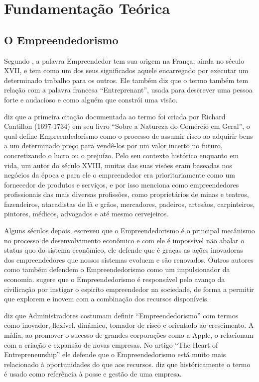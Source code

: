 \chapter[Fundamentação Teórica]{Fundamentação Teórica}
\label{cap-fundamentacao_teorica}

\section{O Empreendedorismo}
\label{section:o_empreendedorismo}

Segundo \cite{McCall2000}, a palavra Empreendedor tem sua origem na França, ainda no século XVII, e tem como um dos seus significados aquele encarregado por executar um determinado trabalho para os outros. Ele também diz que o termo também tem relação com a palavra francesa ``Entreprenant'', usada para descrever uma pessoa forte e audacioso e como alguém que constrói uma visão.

\cite{Brown2013} diz que a primeira citação documentada ao termo foi criada por Richard Cantillon (1697-1734) em seu livro ``Sobre a Natureza do Comércio em Geral'', o qual define Empreendedorismo como o processo de assumir risco ao adquirir bens a um determinado preço para vendê-los por um valor incerto no futuro, concretizando o lucro ou o prejuízo. Pelo seu contexto histórico enquanto em vida, um autor do século XVIII, muitas das suas visões eram baseadas nos negócios da época e para ele o empreendedor era prioritariamente como um fornecedor de produtos e serviços, e por isso menciona como empreendedores profissionais das mais diversas profissões, como proprietários de minas e teatros, fazendeiros, atacadistas de lã e grãos, mercadores, padeiros, artesãos, carpinteiros, pintores, médicos, advogados e até mesmo cervejeiros. 

Alguns séculos depois, \cite{Schumpeter1934} escreveu que o Empreendedorismo é o principal mecânismo no processo de desenvolvimento econômico e com ele é impossível não abalar o status quo do sistema econômico, ele defende que é graças as ações inovadoras dos empreendedores que nossos sistemas evoluem e são renovados. Outros autores como \cite{Holcombe1998, Acs2006} também defendem o Empreendedorismo como um impulsionador da economia. \cite{McClelland1961} sugere que o Empreendedorismo é responsável pelo avanço da civilicação por instigar o espiríto empreendedor na sociedade, de forma a permitir que explorem e inovem com a combinação dos recursos disponíveis.

\cite{Stevenson1985} diz que Administradores costumam definir ``Empreendedorismo'' com termos como inovador, flexível, dinâmico, tomador de risco e orientado ao crescimento. A mídia, ao promover o sucesso de grandes corporações como a Apple, o relacionam com a criação e expansão de novas empresas. No artigo ``The Heart of Entrepreneurship'' ele defende que o Empreendedorismo está muito mais relacionado à oportunidades do que aos recursos. \cite{Acs2006} diz que históricamente o termo é usado como referência à posse e gestão de uma empresa.


